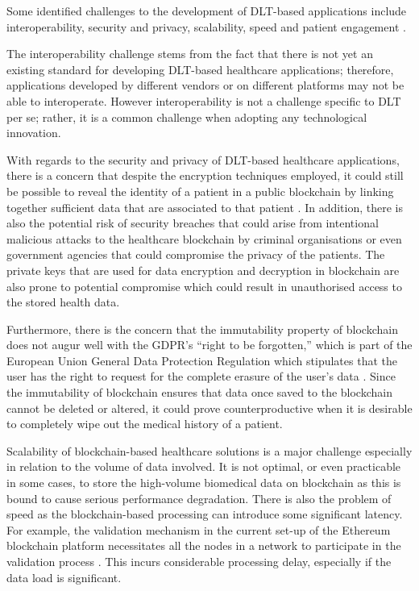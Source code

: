 Some identified challenges to the development of DLT-based applications include interoperability, security and privacy, scalability, speed and patient engagement \cite{kamel2018geospatial}.

The interoperability challenge stems from the fact that there is not yet an existing standard for developing DLT-based healthcare applications; therefore, applications developed by different vendors or on different platforms may not be able to interoperate. However interoperability is not a challenge specific to DLT per se; rather, it is a common challenge when adopting any technological innovation.

With regards to the security and privacy of DLT-based healthcare applications, there is a concern that despite the encryption techniques employed, it could still be possible to reveal the identity of a patient in a public blockchain by linking together sufficient data that are associated to that patient \cite{radanovic2018opportunities}. In addition, there is also the potential risk of security breaches that could arise from intentional malicious attacks to the healthcare blockchain by criminal organisations or even government agencies that could compromise the privacy of the patients. The private keys that are used for data encryption and decryption in blockchain are also prone to potential compromise which could result in unauthorised access to the stored health data.

Furthermore, there is the concern that the immutability property of blockchain does not augur well with the GDPR’s “right to be forgotten,” which is part of the European Union General Data Protection Regulation which stipulates that the user has the right to request for the complete erasure of the user’s data \cite{foglia2020patients}. Since the immutability of blockchain ensures that data once saved to the blockchain cannot be deleted or altered, it could prove counterproductive when it is desirable to completely wipe out the medical history of a patient.

Scalability of blockchain-based healthcare solutions is a major challenge especially in relation to the volume of data involved. It is not optimal, or even practicable in some cases, to store the high-volume biomedical data on blockchain as this is bound to cause serious performance degradation. There is also the problem of speed as the blockchain-based processing can introduce some significant latency. For example, the validation mechanism in the current set-up of the Ethereum blockchain platform necessitates all the nodes in a network to participate in the validation process \cite{yli2016current}. This incurs considerable processing delay, especially if the data load is significant.


